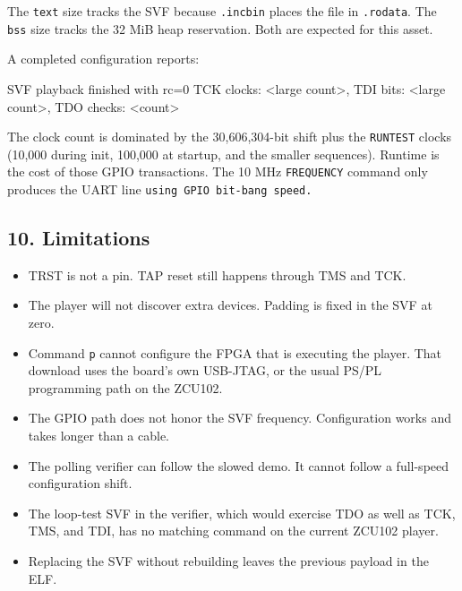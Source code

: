 \documentclass[
  11pt,
  a4paper,
]{article}
\newenvironment{Shaded}{}{}
\newcommand{\NormalTok}[1]{#1}
\providecommand{\tightlist}{%
  \setlength{\itemsep}{0pt}\setlength{\parskip}{0pt}}
\begin{document}
The \texttt{text} size tracks the SVF because \texttt{.incbin} places
the file in \texttt{.rodata}. The \texttt{bss} size tracks the 32 MiB
heap reservation. Both are expected for this asset.

A completed configuration reports:

\begin{Shaded}
\begin{Highlighting}[]
\NormalTok{SVF playback finished with rc=0}
\NormalTok{TCK clocks: \textless{}large count\textgreater{}, TDI bits: \textless{}large count\textgreater{}, TDO checks: \textless{}count\textgreater{}}
\end{Highlighting}
\end{Shaded}

The clock count is dominated by the 30,606,304-bit shift plus the
\texttt{RUNTEST} clocks (10,000 during init, 100,000 at startup, and the
smaller sequences). Runtime is the cost of those GPIO transactions. The
10 MHz \texttt{FREQUENCY} command only produces the UART line
\texttt{using\ GPIO\ bit-bang\ speed.}

\subsection{10. Limitations}\label{limitations}

\begin{itemize}
\tightlist
\item
  TRST is not a pin. TAP reset still happens through TMS and TCK.
\item
  The player will not discover extra devices. Padding is fixed in the
  SVF at zero.
\item
  Command \texttt{p} cannot configure the FPGA that is executing the
  player. That download uses the board's own USB-JTAG, or the usual
  PS/PL programming path on the ZCU102.
\item
  The GPIO path does not honor the SVF frequency. Configuration works
  and takes longer than a cable.
\item
  The polling verifier can follow the slowed demo. It cannot follow a
  full-speed configuration shift.
\item
  The loop-test SVF in the verifier, which would exercise TDO as well as
  TCK, TMS, and TDI, has no matching command on the current ZCU102
  player.
\item
  Replacing the SVF without rebuilding leaves the previous payload in
  the ELF.
\end{itemize}
\end{document}
